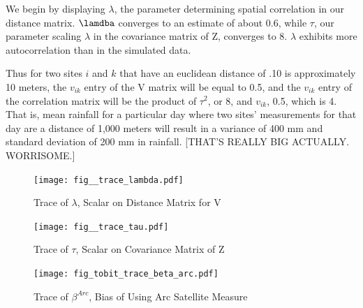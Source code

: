 \documentclass[12pt]{article}
\begin{document}





We begin by displaying $\lambda$, the parameter determining spatial correlation in our distance matrix. $\lamdba$ converges to an estimate of about 0.6, while $\tau$, our parameter scaling $\lambda$ in the covariance matrix of Z, converges to 8. $\lambda$ exhibits more autocorrelation than in the simulated data.



Thus for two sites $i$ and $k$ that have an euclidean distance of .10 is approximately 10 meters, the $v_{ik}$ entry of the V matrix will be equal to 0.5, and the $v_{ik}$ entry of the correlation matrix will be the product of $\tau^{2}$, or 8, and $v_{ik}$, 0.5, which is 4. That is, mean rainfall for a particular day where two sites' measurements for that day are a distance of 1,000 meters will result in a variance of 400 mm and standard deviation of 200 mm in rainfall. [THAT'S REALLY BIG ACTUALLY. WORRISOME.]



\begin{figure}[htbp]
\caption{Trace of $\lambda$, Scalar on Distance Matrix for V}
\begin{center}
\texttt{[image: fig\_\_trace\_lambda.pdf]}
\end{center}
\end{figure}



\begin{figure}[htbp]
\caption{Trace of $\tau$, Scalar on Covariance Matrix of Z}
\begin{center}
\texttt{[image: fig\_\_trace\_tau.pdf]}
\end{center}
\end{figure}




\begin{figure}[htbp]
\caption{Trace of $\beta^{Arc}$, Bias of Using Arc Satellite Measure}
\begin{center}
\texttt{[image: fig\_tobit\_trace\_beta\_arc.pdf]}
\end{center}
\end{figure}
\end{document}
